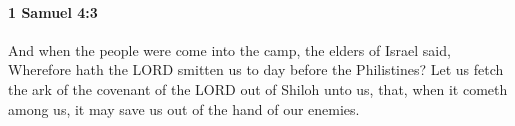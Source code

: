 
		\paragraph{1 Samuel 4:3} %
			\label{1SAMUEL-4-3}

			And when the people were come into the camp, the elders of Israel said, Wherefore hath the LORD smitten us to day before the Philistines? Let us fetch the ark of the covenant of the LORD out of Shiloh unto us, that, when it cometh among us, it may save us out of the hand of our enemies.


